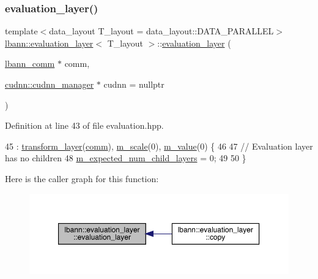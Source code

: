\subsubsection{\texorpdfstring{evaluation\+\_\+layer()}{evaluation\_layer()}}
{\footnotesize\ttfamily template$<$data\+\_\+layout T\+\_\+layout = data\+\_\+layout\+::\+D\+A\+T\+A\+\_\+\+P\+A\+R\+A\+L\+L\+EL$>$ \\
\hyperlink{classlbann_1_1evaluation__layer}{lbann\+::evaluation\+\_\+layer}$<$ T\+\_\+layout $>$\+::\hyperlink{classlbann_1_1evaluation__layer}{evaluation\+\_\+layer} (\begin{DoxyParamCaption}\item[{\hyperlink{classlbann_1_1lbann__comm}{lbann\+\_\+comm} $\ast$}]{comm,  }\item[{\hyperlink{classlbann_1_1cudnn_1_1cudnn__manager}{cudnn\+::cudnn\+\_\+manager} $\ast$}]{cudnn = {\ttfamily nullptr} }\end{DoxyParamCaption})\hspace{0.3cm}{\ttfamily [inline]}}



Definition at line 43 of file evaluation.\+hpp.


\begin{DoxyCode}
45     : \hyperlink{classlbann_1_1transform__layer_a4b72501e0f4d0745c8b13c5331055e65}{transform\_layer}(\hyperlink{file__io_8cpp_ab048c6f9fcbcfaa57ce68b00263dbebe}{comm}), \hyperlink{classlbann_1_1evaluation__layer_af365bda5700dca43434b01f0a2b1ee45}{m\_scale}(0), \hyperlink{classlbann_1_1evaluation__layer_a0d45f7694e2778f0a0dfb49212f37aef}{m\_value}(0) \{
46 
47     \textcolor{comment}{// Evaluation layer has no children}
48     \hyperlink{classlbann_1_1Layer_ac08f133dddd150319650e220ab9a523a}{m\_expected\_num\_child\_layers} = 0;
49 
50   \}
\end{DoxyCode}
Here is the caller graph for this function\+:\nopagebreak
\begin{figure}[H]
\begin{center}
\leavevmode
\includegraphics[width=350pt]{classlbann_1_1evaluation__layer_a55aea0fdd91154eccbbd8a1e6a8ce5e3_icgraph}
\end{center}
\end{figure}


